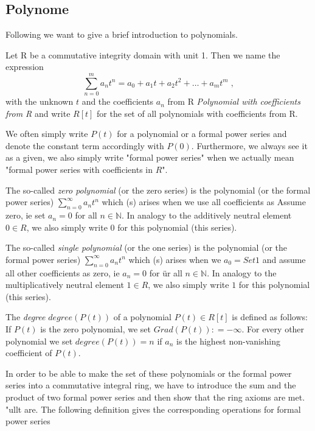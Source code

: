 \subsection{Polynome}
Following \cite{LK} we want to give a brief introduction to polynomials. 
\begin{definition}[Polynomials]
Let R be a commutative integrity domain with unit 1.
Then we name the expression
\begin{equation}
\sum _{n = 0} ^{m}{a} _{n}{t} ^{n} ={a} _{0} +{a} _{1} t +{a} _{2} t ^ 2 + \dots + a_m t ^ m \;,
\end{equation}
with the unknown $ t $ and the coefficients $ a_n $ from R
\textit{Polynomial with coefficients from R} and write
$ R [t] $ for the set of all polynomials with coefficients from R.
\end{definition}
We often simply write $ P (t) $ for a polynomial or a formal power series and denote the constant term accordingly with $ P (0) $. Furthermore, we always see it as a given, we also simply write "formal power series" when we actually mean "formal power series with coefficients in $ R $".
\begin{example}
\label{def: zero polynomial}
The so-called \textit{zero polynomial} (or the zero series) is the polynomial (or the formal power series) $ \sum_{n = 0} ^ \infty a_n t ^ n $ which (s) arises when we use all coefficients as Assume zero, ie set $ a_n = 0 $ for all $ n \in \mathbb{N} $. In analogy to the additively neutral element $ 0 \in R $, we also simply write $ 0 $ for this polynomial (this series).

The so-called \textit{single polynomial} (or the one series) is the polynomial (or the formal power series) $ \sum_{n = 0} ^ \infty a_n t ^ n $ which (s) arises when we $ a_0 = Set 1 $ and assume all other coefficients as zero, ie $ a_n = 0 $ for \"ur all $ n \in \mathbb{N} $. In analogy to the multiplicatively neutral element $ 1 \in R $, we also simply write $ 1 $ for this polynomial (this series).
\end{example}
\begin{definition}[degree] The \textit{degree} $ degree (P (t)) $ of a polynomial
$ P (t) \in R [t] $ is defined as follows: If $ P (t) $ is the zero polynomial, we set $ Grad (P (t)): = - \infty $. For every other polynomial we set $ degree (P (t)) = n $ if $ a_n $ is the highest non-vanishing coefficient of $ P (t) $.
\end{definition}
In order to be able to make the set of these polynomials or the formal power series into a commutative integral ring, we have to introduce the sum and the product of two formal power series and then show that the ring axioms are met. "ullt are. The following definition gives the corresponding operations for formal power series
